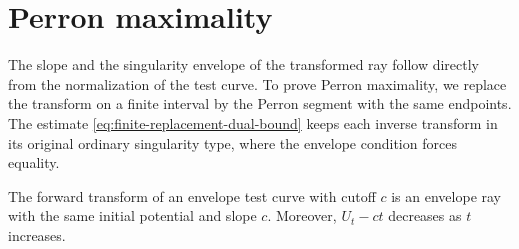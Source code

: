 \section{Perron maximality}

The slope and the singularity envelope of the transformed ray follow directly from the normalization of the test curve. To prove Perron maximality, we replace the transform on a finite interval by the Perron segment with the same endpoints. The estimate \eqref{eq:finite-replacement-dual-bound} keeps each inverse transform in its original ordinary singularity type, where the envelope condition forces equality.

\begin{theorem}\label{thm:testcurve-to-envelope-ray}
The forward transform of an envelope test curve with cutoff $c$ is an envelope ray with the same initial potential and slope $c$. Moreover, $U_t-ct$ decreases as $t$ increases.
\end{theorem}
